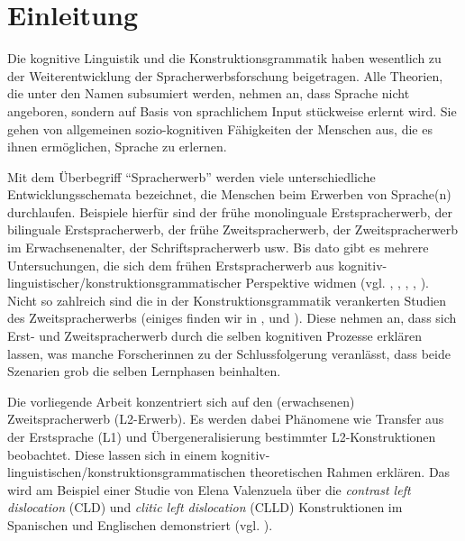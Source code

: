 \section{Einleitung}

\begin{comment}
* ca 3/4 Seiten
* Untersuchungsgegenstand
* Erkenntnisinteresse
* Forschungsstand
* Vorgehensweise: also Section 2 macht blabla, Section 3 blablup, ....
* Ergebnisse können/sollen angedeuten werden
\end{comment}

Die kognitive Linguistik und die Konstruktionsgrammatik haben wesentlich zu der Weiterentwicklung der Spracherwerbsforschung beigetragen.
Alle Theorien, die unter den Namen subsumiert werden, nehmen an, dass Sprache nicht angeboren, sondern auf Basis von sprachlichem Input stückweise erlernt wird.
Sie gehen von allgemeinen sozio-kognitiven Fähigkeiten der Menschen aus, die es ihnen ermöglichen, Sprache zu erlernen.

Mit dem Überbegriff ``Spracherwerb'' werden viele unterschiedliche Entwicklungsschemata bezeichnet, die Menschen beim Erwerben von Sprache(n) durchlaufen.
Beispiele hierfür sind der frühe monolinguale Erstspracherwerb, der bilinguale Erstspracherwerb, der frühe Zweitspracherwerb, der Zweitspracherwerb im Erwachsenenalter, der Schriftspracherwerb usw.
Bis dato gibt es mehrere Untersuchungen, die sich dem frühen Erstspracherwerb aus kognitiv-linguistischer/konstruktionsgrammatischer Perspektive widmen (vgl. \cite{Brooks99}, \cite{Tomasello01}, \cite{Lieven03}, \cite{Tomasello03}, \cite{Tomasello06}).
Nicht so zahlreich sind die in der Konstruktionsgrammatik verankerten Studien des Zweitspracherwerbs (einiges finden wir in \cite{Ellis04}, \cite{Eskildsen08} und \cite{Haberzettl06}).
Diese nehmen an, dass sich Erst- und Zweitspracherwerb durch die selben kognitiven Prozesse erklären lassen, was manche Forscherinnen zu der Schlussfolgerung veranlässt, dass beide Szenarien grob die selben Lernphasen beinhalten.

Die vorliegende Arbeit konzentriert sich auf den (erwachsenen) Zweitspracherwerb (L2-Erwerb).
Es werden dabei Phänomene wie Transfer aus der Erstsprache (L1) und Übergeneralisierung bestimmter L2-Konstruktionen beobachtet.
Diese lassen sich in einem kognitiv-linguistischen/konstruktionsgrammatischen theoretischen Rahmen erklären.
Das wird am Beispiel einer Studie von Elena Valenzuela über die \textit{contrast left dislocation} (CLD) und \textit{clitic left dislocation} (CLLD) Konstruktionen im Spanischen und Englischen demonstriert (vgl. \cite{Valenzuela05}).

